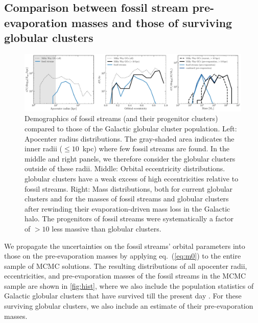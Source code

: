 \documentclass[twocolumn]{aastex63}
\begin{document}
\subsection{Comparison between fossil stream pre-evaporation masses and those of surviving globular clusters}
\begin{figure}
\includegraphics[width=\hsize]{figures/distributions_mc.pdf}%
\caption{
\label{fig:hist}
Demographics of fossil streams (and their progenitor clusters) compared to those of the Galactic globular cluster population. Left: Apocenter radius distributions. The gray-shaded area indicates the inner radii ($\leq10$~kpc) where few fossil streams are found. In the middle and right panels, we therefore consider the globular clusters outside of these radii. Middle: Orbital eccentricity distributions. globular clusters have a weak excess of high eccentricities relative to fossil streams. Right: Mass distributions, both for current globular clusters and for the masses of fossil streams and globular clusters after rewinding their evaporation-driven mass loss in the Galactic halo. The progenitors of fossil streams were systematically a factor of $>10$ less massive than globular clusters.}
\end{figure}	
We propagate the uncertainties on the fossil streams' orbital parameters into those on the pre-evaporation masses by applying eq.~(\ref{eq:m0}) to the entire sample of MCMC solutions. The resulting distributions of all apocenter radii, eccentricities, and pre-evaporation masses of the fossil streams in the MCMC sample are shown in \autoref{fig:hist}, where we also include the population statistics of Galactic globular clusters that have survived till the present day \citep[2010 edition]{harris96}. For these surviving globular clusters, we also include an estimate of their pre-evaporation masses.
\end{document}
